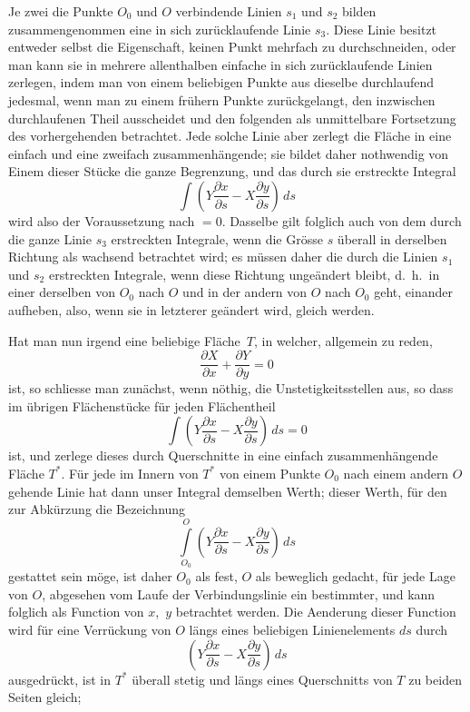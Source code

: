 \documentclass[a4paper,12pt]{article}
\begin{document}
Je zwei die Punkte $O_0$ und $O$ verbindende Linien $s_1$ und
$s_2$ bilden zusammengenommen eine in sich zur\"{u}cklaufende
Linie $s_3$. Diese Linie besitzt entweder selbst die Eigenschaft,
keinen Punkt mehrfach zu durchschneiden, oder man kann sie in
mehrere allenthalben einfache in sich zur\"{u}cklaufende Linien
zerlegen, indem man von einem beliebigen Punkte aus dieselbe
durchlaufend jedesmal, wenn man zu einem fr\"{u}hern Punkte
zur\"{u}ckgelangt, den inzwischen durchlaufenen Theil ausscheidet
und den folgenden als unmittelbare Fortsetzung des vorhergehenden
betrachtet.  Jede solche Linie aber zerlegt die Fl\"{a}che in
eine einfach und eine zweifach zusammenh\"{a}ngende; sie bildet
daher nothwendig von Einem dieser St\"{u}cke die ganze
Begrenzung, und das durch sie erstreckte Integral
\[ \int  \left(
            Y \frac{\partial x}{\partial s}
          - X \frac{\partial y}{\partial s}
         \right) \, ds \]
wird also der Voraussetzung nach $= 0$.  Dasselbe gilt folglich
auch von dem durch die ganze Linie $s_3$ erstreckten Integrale,
wenn die Gr\"{o}sse $s$ \"{u}berall in derselben Richtung als
wachsend betrachtet wird; es m\"{u}ssen daher die durch die
Linien $s_1$ und $s_2$ erstreckten Integrale, wenn diese
Richtung unge\"{a}ndert bleibt, d.~h.\ in einer derselben von
$O_0$ nach $O$ und in der andern von $O$ nach $O_0$ geht,
einander aufheben, also, wenn sie in letzterer ge\"{a}ndert wird,
gleich werden.

Hat man nun irgend eine beliebige Fl\"{a}che~$T$, in welcher,
allgemein zu reden,
\[ \frac{\partial X}{\partial x} + \frac{\partial Y}{\partial y}
   = 0 \]
ist, so schliesse man zun\"{a}chst, wenn n\"{o}thig, die
Unstetigkeitsstellen aus, so dass im \"{u}brigen
Fl\"{a}chenst\"{u}cke f\"{u}r jeden Fl\"{a}chentheil
\[ \int  \left(
            Y \frac{\partial x}{\partial s}
          - X \frac{\partial y}{\partial s}
         \right) \, ds
   = 0 \]
ist, und zerlege dieses durch Querschnitte in eine einfach
zusammenh\"{a}ngende Fl\"{a}che $T^*$.  F\"{u}r jede im Innern
von $T^*$ von einem Punkte $O_0$ nach einem andern $O$ gehende
Linie hat dann unser Integral demselben Werth; dieser Werth,
f\"{u}r den zur Abk\"{u}rzung die Bezeichnung
\[ \int\limits_{O_0}^O  \left(
            Y \frac{\partial x}{\partial s}
          - X \frac{\partial y}{\partial s}
         \right) \, ds \]
gestattet sein m\"{o}ge, ist daher $O_0$ als fest, $O$ als
beweglich gedacht, f\"{u}r jede Lage von $O$, abgesehen vom Laufe
der Verbindungslinie ein bestimmter, und kann folglich als
Function von $x$,~$y$ betrachtet werden.  Die Aenderung dieser
Function wird f\"{u}r eine Verr\"{u}ckung von $O$ l\"{a}ngs eines
beliebigen Linienelements $ds$ durch
\[ \left(
            Y \frac{\partial x}{\partial s}
          - X \frac{\partial y}{\partial s}
         \right) \, ds \]
ausgedr\"{u}ckt, ist in $T^*$ \"{u}berall stetig und l\"{a}ngs
eines Querschnitts von $T$ zu beiden Seiten gleich;
\end{document}
